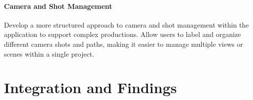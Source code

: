 \paragraph{Camera and Shot Management}
Develop a more structured approach to camera and shot management within the application to support complex productions.
Allow users to label and organize different camera shots and paths, making it easier to manage multiple views or scenes within a single project.



\section{Integration and Findings}
\label{sec:result:findings}

